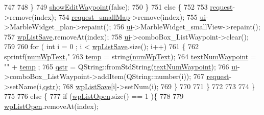 \begin{DoxyCode}
{747 
748                  \}
749                      \hyperlink{a00008_a35f9f0904259437c4ae21b41c4f759c1}{showEditWaypoint}(\textcolor{keyword}{false});
750                  \}
751                  \textcolor{keywordflow}{else} \{
752 
753                      \hyperlink{a00008_ade0ea03ae98566eaed4f7a1f331f237a}{request}->remove(index);
754                      \hyperlink{a00008_aeae2fdde26f8ed9003c0cf66a1f25662}{request\_smallMap}->remove(index);
755                      \hyperlink{a00008_a6dc041ef6a2ffb329928d2913e8344e6}{ui}->MarbleWidget\_plan->repaint();
756                      \hyperlink{a00008_a6dc041ef6a2ffb329928d2913e8344e6}{ui}->MarbleWidget\_smallView->repaint();
757                      \hyperlink{a00008_ad11e2550a13b49086c06cf1c1dbf0a45}{wpListSave}.removeAt(index);
758                      \hyperlink{a00008_a6dc041ef6a2ffb329928d2913e8344e6}{ui}->comboBox\_ListWaypoint->clear();
759 
760                      \textcolor{keywordflow}{for} ( \textcolor{keywordtype}{int} i = 0 ; i < \hyperlink{a00008_ad11e2550a13b49086c06cf1c1dbf0a45}{wpListSave}.size(); i++)
761                      \{
762                          sprintf(\hyperlink{a00008_aad93f0b04d6ea6ac097124ef453bef9d}{numWpText},\textcolor{stringliteral}{"%
763                          \hyperlink{a00008_a57c52213e1c32a667a5963a122e0a23b}{temp} = string(\hyperlink{a00008_aad93f0b04d6ea6ac097124ef453bef9d}{numWpText});
764                          \hyperlink{a00008_aa6011e6576184fcd9e0841fdffbaa826}{textNumWaypoint} = \textcolor{stringliteral}{""} + \hyperlink{a00008_a57c52213e1c32a667a5963a122e0a23b}{temp} ;
765                          \hyperlink{a00008_add3cc0473ea4a2ff453620e16ac24056}{qstr} = QString::fromStdString(\hyperlink{a00008_aa6011e6576184fcd9e0841fdffbaa826}{textNumWaypoint});
766                          \hyperlink{a00008_a6dc041ef6a2ffb329928d2913e8344e6}{ui}->comboBox\_ListWaypoint->addItem(QString::number(i));
767                          \hyperlink{a00008_ade0ea03ae98566eaed4f7a1f331f237a}{request}->setName(i,\hyperlink{a00008_add3cc0473ea4a2ff453620e16ac24056}{qstr});
768                          \hyperlink{a00008_ad11e2550a13b49086c06cf1c1dbf0a45}{wpListSave}[i]->setNum(i);
769                      \}
770 
771                  \}
772 
773 
774              \}
775 
776              \textcolor{keywordflow}{else} \{
777                      \textcolor{keywordflow}{if} (\hyperlink{a00008_a5d3a9439b166172c9c871c9a723eac19}{wpListOpen}.size() == 1 )\{
778 
779                          \hyperlink{a00008_a5d3a9439b166172c9c871c9a723eac19}{wpListOpen}.removeAt(index);
}}
\end{DoxyCode}
